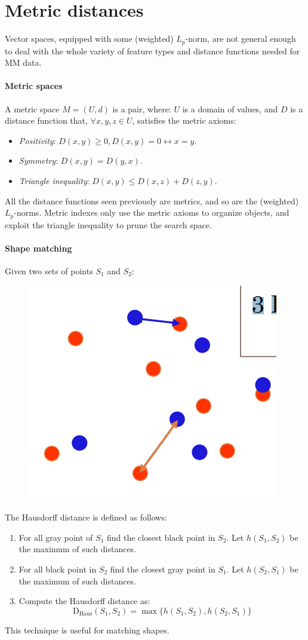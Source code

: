 \section{Metric distances}

Vector spaces, equipped with some (weighted) $L_p$-norm, are not general enough to deal with the whole variety of feature types and distance functions needed for MM data. 

\paragraph*{Metric spaces}
A metric space $M = (U,d)$ is a pair, where:
$U$ is a domain of values, and $D$ is a distance function that, $\forall x,y,z \in U$, satisfies the metric axioms:
\begin{itemize}
    \item \textit{Positivity}: $D(x,y) \geq 0, D(x,y) = 0 \leftrightarrow x = y$.
    \item \textit{Symmetry}: $D(x,y) = D(y,x)$. 
    \item \textit{Triangle inequality}: $D(x,y) \leq D(x,z) + D(z,y)$. 
\end{itemize}
All the distance functions seen previously are metrics, and so are the (weighted) $L_p$-norms. 
Metric indexes only use the metric axioms to organize objects, and exploit the triangle inequality to prune the search space. 

\paragraph*{Shape matching}
Given two sets of points $S_1$ and $S_2$: 
\begin{figure}[H]
    \centering
    \includegraphics[width=0.5\linewidth]{images/hd.png}
\end{figure}
The Hausdorff distance is defined as follows:
\begin{enumerate}
    \item For all gray point of $S_1$ find the closest black point in $S_2$. 
        Let $h(S_1,S_2)$ be the maximum of such distances. 
    \item For all black point in $S_2$ find the closest gray point in $S_1$. 
        Let $h(S_2,S_1)$ be the maximum of such distances. 
    \item Compute the Hausdorff distance as: 
        \[\text{D}_{\text{Haus}}(S_1,S_2) = \max\{ h(S_1,S_2),h(S_2,S_1)\}\]
\end{enumerate}
This technique is useful for matching shapes. 

